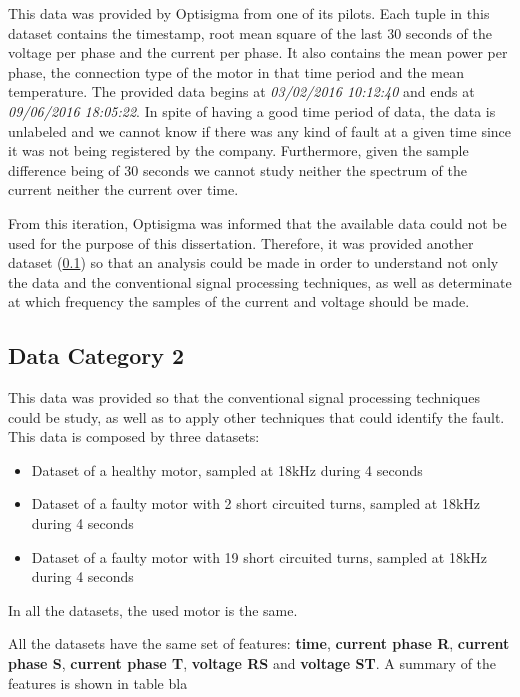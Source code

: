 This data was provided by Optisigma from one of its pilots. Each tuple in this dataset contains the timestamp, root mean square of the last 30 seconds of the voltage per phase and the  current per phase. It also contains the mean power per phase, the connection type of the motor in that time period and the mean temperature.
The provided data begins at \emph{03/02/2016  10:12:40} and ends at \emph{09/06/2016  18:05:22}.
In spite of having a good time period of data, the data is unlabeled and we cannot know if there was any kind of fault at a given time since it was not being registered by the company.
Furthermore, given the sample difference being of 30 seconds we cannot study neither the spectrum of the current neither the current over time.

From this iteration, Optisigma was informed that the available data could not be used for the purpose of this dissertation.
Therefore, it was provided another dataset (\ref{subsec:data_category_2}) so that an analysis could be made in order to understand not only the data and the conventional signal processing techniques, as well as determinate at which frequency the samples of the current and voltage should be made.

\subsection{Data Category 2}
\label{subsec:data_category_2}

This data was provided so that the conventional signal processing techniques could be study, as well as to apply other techniques that could identify the fault. This data is composed by three datasets:

\begin{itemize}
  \item 
  Dataset of a healthy motor, sampled at 18kHz during 4 seconds
  \item 
  Dataset of a faulty motor with 2 short circuited turns, sampled at 18kHz during 4 seconds
  \item 
  Dataset of a faulty motor with 19 short circuited turns, sampled at 18kHz during 4 seconds
\end{itemize}

In all the datasets, the used motor is the same.

All the datasets have the same set of features:  \textbf{time}, \textbf{current phase R}, \textbf{current phase S}, \textbf{current phase T}, \textbf{voltage RS} and \textbf{voltage ST}. A summary of the features is shown in table bla

